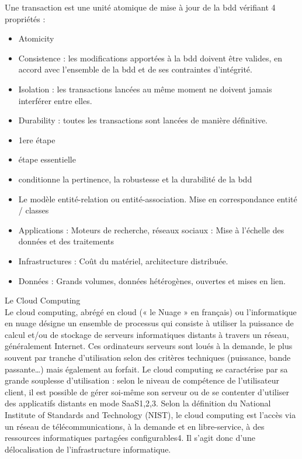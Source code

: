 
 Une transaction est une unité atomique de mise à jour de la bdd vérifiant 4 propriétés :
\begin{itemize}
	\item Atomicity
	\item Consistence : les modifications apportées à la bdd doivent être valides, en accord avec l'ensemble de la bdd et de ses contraintes d'intégrité. 
	\item Isolation : les transactions lancées au même moment ne doivent jamais interférer entre elles.
	\item Durability : toutes les transactions sont lancées de manière définitive.
\end{itemize}

\begin{itemize}
	\item 1ere étape
	\item étape essentielle
	\item conditionne la pertinence, la robustesse et la durabilité de la bdd
\end{itemize}

\begin{itemize}
	\item Le modèle entité-relation ou entité-association. Mise en correspondance entité / classes
\end{itemize}

\begin{itemize}
	\item Applications : Moteurs de recherche, réseaux sociaux : Mise à l'échelle des données et des traitements
	\item Infrastructures : Coût du matériel, architecture distribuée.
	\item Données : Grands volumes, données hétérogènes, ouvertes et mises en lien.
\end{itemize}

 Le Cloud Computing \\
Le cloud computing, abrégé en cloud (« le Nuage » en français) ou l’informatique en nuage désigne un ensemble de processus qui consiste à utiliser la puissance de calcul et/ou de stockage de serveurs informatiques distants à travers un réseau, généralement Internet. Ces ordinateurs serveurs sont loués à la demande, le plus souvent par tranche d'utilisation selon des critères techniques (puissance, bande passante…) mais également au forfait. Le cloud computing se caractérise par sa grande souplesse d'utilisation : selon le niveau de compétence de l'utilisateur client, il est possible de gérer soi-même son serveur ou de se contenter d'utiliser des applicatifs distants en mode SaaS1,2,3. Selon la définition du National Institute of Standards and Technology (NIST), le cloud computing est l'accès via un réseau de télécommunications, à la demande et en libre-service, à des ressources informatiques partagées configurables4. Il s'agit donc d'une délocalisation de l'infrastructure informatique. \\

